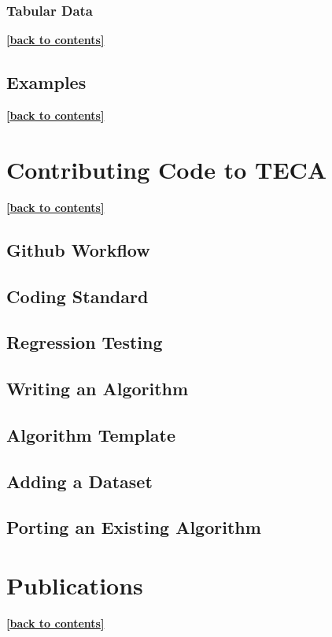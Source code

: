 \documentclass[a4paper,10pt,DIV=12]{scrreprt}
\begin{document}
\subsection{Tabular Data}
\hyperlink{toc}{\footnotesize \bf [back to contents]}

\section{Examples}
\hyperlink{toc}{\footnotesize \bf [back to contents]}

\chapter{Contributing Code to TECA}
\hyperlink{toc}{\footnotesize \bf [back to contents]}
\section{Github Workflow}
\section{Coding Standard}
\section{Regression Testing}
\section{Writing an Algorithm}
\section{Algorithm Template}
\section{Adding a Dataset}
\section{Porting an Existing Algorithm}

\chapter{Publications}
\hyperlink{toc}{\footnotesize \bf [back to contents]}
\end{document}
